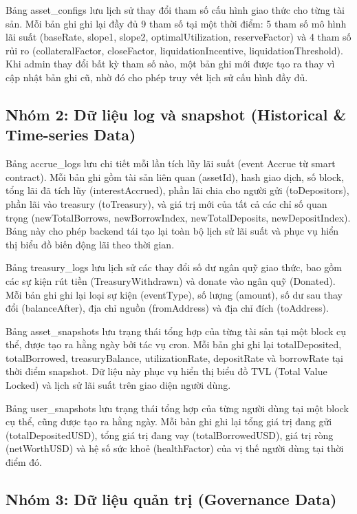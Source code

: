 \documentclass[../DoAn.tex]{subfiles}
\begin{document}
Bảng asset\_configs lưu lịch sử thay đổi tham số cấu hình giao thức cho từng tài sản. Mỗi bản ghi ghi lại đầy đủ 9 tham số tại một thời điểm: 5 tham số mô hình lãi suất (baseRate, slope1, slope2, optimalUtilization, reserveFactor) và 4 tham số rủi ro (collateralFactor, closeFactor, liquidationIncentive, liquidationThreshold). Khi admin thay đổi bất kỳ tham số nào, một bản ghi mới được tạo ra thay vì cập nhật bản ghi cũ, nhờ đó cho phép truy vết lịch sử cấu hình đầy đủ.

\subsection{Nhóm 2: Dữ liệu log và snapshot (Historical \& Time-series Data)}


Bảng accrue\_logs lưu chi tiết mỗi lần tích lũy lãi suất (event Accrue từ smart contract). Mỗi bản ghi gồm tài sản liên quan (assetId), hash giao dịch, số block, tổng lãi đã tích lũy (interestAccrued), phần lãi chia cho người gửi (toDepositors), phần lãi vào treasury (toTreasury), và giá trị mới của tất cả các chỉ số quan trọng (newTotalBorrows, newBorrowIndex, newTotalDeposits, newDepositIndex). Bảng này cho phép backend tái tạo lại toàn bộ lịch sử lãi suất và phục vụ hiển thị biểu đồ biến động lãi theo thời gian.

Bảng treasury\_logs lưu lịch sử các thay đổi số dư ngân quỹ giao thức, bao gồm các sự kiện rút tiền (TreasuryWithdrawn) và donate vào ngân quỹ (Donated). Mỗi bản ghi ghi lại loại sự kiện (eventType), số lượng (amount), số dư sau thay đổi (balanceAfter), địa chỉ nguồn (fromAddress) và địa chỉ đích (toAddress).

Bảng asset\_snapshots lưu trạng thái tổng hợp của từng tài sản tại một block cụ thể, được tạo ra hằng ngày bởi tác vụ cron. Mỗi bản ghi ghi lại totalDeposited, totalBorrowed, treasuryBalance, utilizationRate, depositRate và borrowRate tại thời điểm snapshot. Dữ liệu này phục vụ hiển thị biểu đồ TVL (Total Value Locked) và lịch sử lãi suất trên giao diện người dùng.

Bảng user\_snapshots lưu trạng thái tổng hợp của từng người dùng tại một block cụ thể, cũng được tạo ra hằng ngày. Mỗi bản ghi ghi lại tổng giá trị đang gửi (totalDepositedUSD), tổng giá trị đang vay (totalBorrowedUSD), giá trị ròng (netWorthUSD) và hệ số sức khoẻ (healthFactor) của vị thế người dùng tại thời điểm đó.

\subsection{Nhóm 3: Dữ liệu quản trị (Governance Data)}
\end{document}
